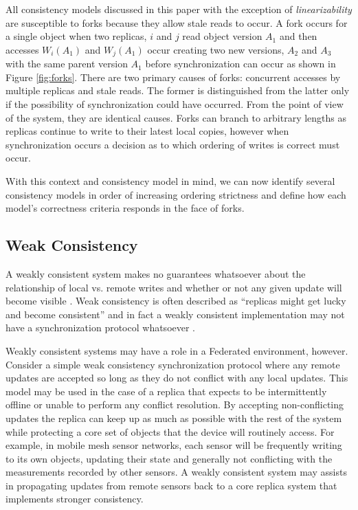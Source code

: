 \documentclass[10pt,conference,letterpaper]{IEEEtran}
\begin{document}
All consistency models discussed in this paper with the exception of \textit{linearizability} are susceptible to forks because they allow stale reads to occur. A fork occurs for a single object when two replicas, $i$ and $j$ read object version $A_1$ and then accesses $W_i(A_1)$ and $W_j(A_1)$ occur creating two new versions, $A_2$ and $A_3$ with the same parent version $A_1$ before synchronization can occur as shown in Figure \ref{fig:forks}. There are two primary causes of forks: concurrent accesses by multiple replicas and stale reads. The former is distinguished from the latter only if the possibility of synchronization could have occurred. From the point of view of the system, they are identical causes. Forks can branch to arbitrary lengths as replicas continue to write to their latest local copies, however when synchronization occurs a decision as to which ordering of writes is correct must occur.

With this context and consistency model in mind, we can now identify several consistency models in order of increasing ordering strictness and define how each model's correctness criteria responds in the face of forks.

\subsection{Weak Consistency}

A weakly consistent system makes no guarantees whatsoever about the relationship of local vs. remote writes and whether or not any given update will become visible \cite{vogels_eventually_2009}. Weak consistency is often described as ``replicas might get lucky and become consistent'' and in fact a weakly consistent implementation may not have a synchronization protocol whatsoever \cite{bermbach_consistency_2013}.

Weakly consistent systems may have a role in a Federated environment, however. Consider a simple weak consistency synchronization protocol where any remote updates are accepted so long as they do not conflict with any local updates. This model may be used in the case of a replica that expects to be intermittently offline or unable to perform any conflict resolution. By accepting non-conflicting updates the replica can keep up as much as possible with the rest of the system while protecting a core set of objects that the device will routinely access. For example, in mobile mesh sensor networks, each sensor will be frequently writing to its own objects, updating their state and generally not conflicting with the measurements recorded by other sensors. A weakly consistent system may assists in propagating updates from remote sensors back to a core replica system that implements stronger consistency.
\end{document}
